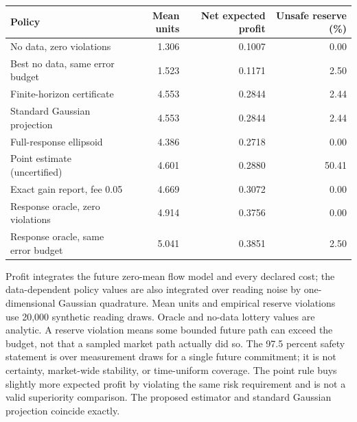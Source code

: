 \begin{center}\footnotesize
\begin{tabular}{p{}rrr}
\toprule
Policy & Mean units & Net expected profit & Unsafe reserve (\%)\\
\midrule
No data, zero violations & 1.306 & 0.1007 & 0.00\\
Best no data, same error budget & 1.523 & 0.1171 & 2.50\\
Finite-horizon certificate & 4.553 & 0.2844 & 2.44\\
Standard Gaussian projection & 4.553 & 0.2844 & 2.44\\
Full-response ellipsoid & 4.386 & 0.2718 & 0.00\\
Point estimate (uncertified) & 4.601 & 0.2880 & 50.41\\
Exact gain report, fee 0.05 & 4.669 & 0.3072 & 0.00\\
Response oracle, zero violations & 4.914 & 0.3756 & 0.00\\
Response oracle, same error budget & 5.041 & 0.3851 & 2.50\\
\bottomrule\end{tabular}\end{center}
Profit integrates the future zero-mean flow model and every declared cost;
the data-dependent policy values are also integrated over reading noise by
one-dimensional Gaussian quadrature. Mean units and empirical reserve
violations use 20,000 synthetic reading draws. Oracle and no-data lottery
values are analytic. A reserve violation means some bounded future path can
exceed the budget, not that a sampled market path actually did so.
The 97.5 percent safety statement is over measurement draws for a single
future commitment; it is not certainty, market-wide stability, or time-uniform
coverage. The point rule buys slightly more expected profit by violating the
same risk requirement and is not a valid superiority comparison.
The proposed estimator and standard Gaussian projection coincide exactly.


